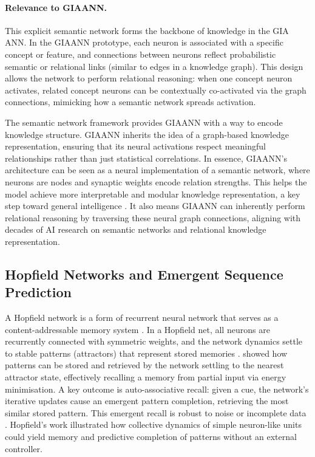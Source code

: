 \paragraph{Relevance to GIAANN.}

This explicit semantic network forms the backbone of knowledge in the GIA ANN.
In the GIAANN prototype, each neuron is associated with a specific concept or feature, and connections between neurons reflect probabilistic semantic or relational links (similar to edges in a knowledge graph).
This design allows the network to perform relational reasoning: when one concept neuron activates, related concept neurons can be contextually co-activated via the graph connections, mimicking how a semantic network spreads activation.

The semantic network framework provides GIAANN with a way to encode knowledge structure.
GIAANN inherits the idea of a graph-based knowledge representation, ensuring that its neural activations respect meaningful relationships rather than just statistical correlations.
In essence, GIAANN’s architecture can be seen as a neural implementation of a semantic network, where neurons are nodes and synaptic weights encode relation strengths.
This helps the model achieve more interpretable and modular knowledge representation, a key step toward general intelligence \citep{baxterai_gia,bairesearch2017GIA}.
It also means GIAANN can inherently perform relational reasoning by traversing these neural graph connections, aligning with decades of AI research on semantic networks and relational knowledge representation.

\subsection{Hopfield Networks and Emergent Sequence Prediction}
A Hopfield network is a form of recurrent neural network that serves as a content-addressable memory system \citep{hopfield1982neural}.
In a Hopfield net, all neurons are recurrently connected with symmetric weights, and the network dynamics settle to stable patterns (attractors) that represent stored memories \citep{hopfield1982neural,amit1985spinGlassNeuralNetworks}.
\citet{hopfield1982neural} showed how patterns can be stored and retrieved by the network settling to the nearest attractor state, effectively recalling a memory from partial input via energy minimisation.
A key outcome is auto-associative recall: given a cue, the network’s iterative updates cause an emergent pattern completion, retrieving the most similar stored pattern.
This emergent recall is robust to noise or incomplete data \citep{amit1985spinGlassNeuralNetworks}.
Hopfield’s work illustrated how collective dynamics of simple neuron-like units could yield memory and predictive completion of patterns without an external controller.

